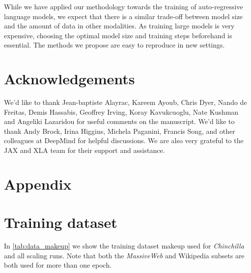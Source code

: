 \documentclass[11pt, a4paper, logo, copyright, nonumbering]{deepmind}
\newcommand{\massiveweb}{\textit{MassiveWeb}\xspace}
\newcommand{\chinchilla}{\textit{Chinchilla}\xspace}
\begin{document}
While we have applied our methodology towards the training of auto-regressive language models, we expect that there is a similar trade-off between model size and the amount of data in other modalities.
As training large models is very expensive, choosing the optimal model size and training steps beforehand is essential.
The methods we propose are easy to reproduce in new settings.

\section{Acknowledgements} 
We'd like to thank Jean-baptiste Alayrac, Kareem Ayoub, Chris Dyer, Nando de Freitas, Demis Hassabis, Geoffrey Irving, Koray Kavukcuoglu, Nate Kushman and Angeliki Lazaridou for useful comments on the manuscript. 
We'd like to thank Andy Brock, Irina Higgins, Michela Paganini, Francis Song, and other colleagues at DeepMind for helpful discussions.
We are also very grateful to the JAX and XLA team for their support and assistance.



\newpage
\appendix
\setcounter{figure}{0}
\makeatletter 
\renewcommand{\thefigure}{A\@arabic\c@figure}
\makeatother

\setcounter{table}{0}
\makeatletter 
\renewcommand{\thetable}{A\@arabic\c@table}
\makeatother

\section*{\centering \Huge{Appendix}}
\section{Training dataset}
In \autoref{tab:data_makeup} we show the training dataset makeup used for \chinchilla and all scaling runs.
Note that both the \massiveweb and Wikipedia subsets are both used for more than one epoch. 
\end{document}
